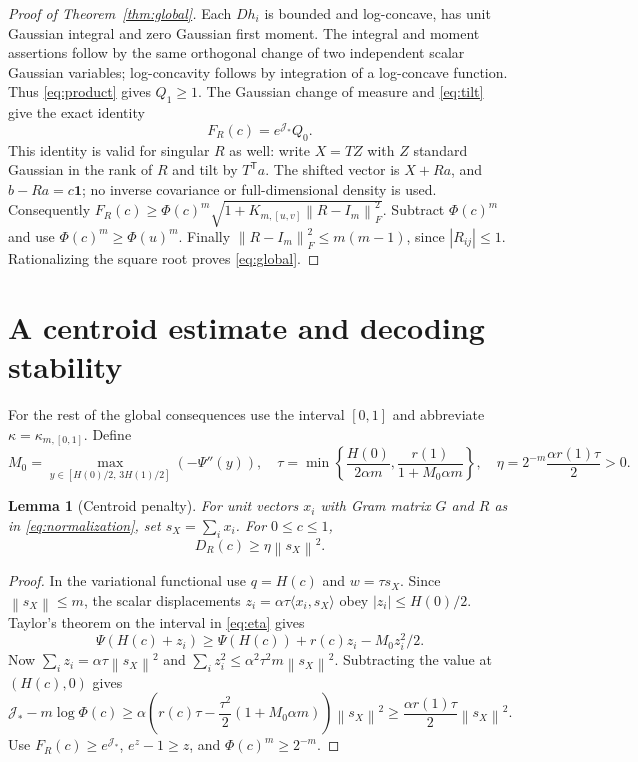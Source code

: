 \documentclass[11pt]{article}
\newtheorem{lemma}[theorem]{Lemma}
\theoremstyle{remark}\newtheorem{remark}[theorem]{Remark}
\newcommand{\one}{\mathbf 1}
\newcommand{\norm}[1]{\left\lVert#1\right\rVert}
\begin{document}
\begin{proof}[Proof of Theorem~\ref{thm:global}]
Each $Dh_i$ is bounded and log-concave, has unit Gaussian integral and zero
Gaussian first moment. The integral and moment assertions follow by the same
orthogonal change of two independent scalar Gaussian variables; log-concavity
follows by integration of a log-concave function. Thus \eqref{eq:product} gives
$Q_1\ge1$. The Gaussian change of measure and \eqref{eq:tilt} give the exact identity
\[
 F_R(c)=e^{\mathcal J_*}Q_0.
\]
This identity is valid for singular $R$ as well: write $X=TZ$ with
$Z$ standard Gaussian in the rank of $R$ and tilt by
$T^{\mathsf T}a$. The shifted vector is $X+Ra$, and $b-Ra=c\one$;
no inverse covariance or full-dimensional density is used.
Consequently $F_R(c)\ge\Phi(c)^m\sqrt{1+K_{m,[u,v]}\norm{R-I_m}_F^2}$.
Subtract $\Phi(c)^m$ and use $\Phi(c)^m\ge\Phi(u)^m$.
Finally $\norm{R-I_m}_F^2\le m(m-1)$, since $|R_{ij}|\le1$.
Rationalizing the square root proves \eqref{eq:global}.
\end{proof}

\section{A centroid estimate and decoding stability}
For the rest of the global consequences use the interval $[0,1]$ and abbreviate
$\kappa=\kappa_{m,[0,1]}$. Define
\begin{equation}\label{eq:eta}
 M_0=\max_{y\in[H(0)/2,\,3H(1)/2]}(-\Psi''(y)),\quad
 \tau=\min\left\{\frac{H(0)}{2\alpha m},
                    \frac{r(1)}{1+M_0\alpha m}\right\},\quad
 \eta=2^{-m}\frac{\alpha r(1)\tau}{2}>0.
\end{equation}

\begin{lemma}[Centroid penalty]\label{lem:centroid}
For unit vectors $x_i$ with Gram matrix $G$ and $R$ as in
\eqref{eq:normalization}, set $s_X=\sum_i x_i$. For $0\le c\le1$,
\begin{equation}\label{eq:centroid}
 D_R(c)\ge\eta\norm{s_X}^2.
\end{equation}
\end{lemma}
\begin{proof}
In the variational functional use $q=H(c)$ and $w=\tau s_X$.
Since $\norm{s_X}\le m$, the scalar displacements
$z_i=\alpha\tau\langle x_i,s_X\rangle$ obey $|z_i|\le H(0)/2$.
Taylor's theorem on the interval in \eqref{eq:eta} gives
\[
 \Psi(H(c)+z_i)\ge\Psi(H(c))+r(c)z_i-M_0z_i^2/2.
\]
Now $\sum_i z_i=\alpha\tau\norm{s_X}^2$ and
$\sum_i z_i^2\le\alpha^2\tau^2m\norm{s_X}^2$.
Subtracting the value at $(H(c),0)$ gives
\[
 \mathcal J_* -m\log\Phi(c)
 \ge\alpha\left(r(c)\tau-\frac{\tau^2}{2}(1+M_0\alpha m)\right)\norm{s_X}^2
 \ge\frac{\alpha r(1)\tau}{2}\norm{s_X}^2.
\]
Use $F_R(c)\ge e^{\mathcal J_*}$, $e^z-1\ge z$, and $\Phi(c)^m\ge2^{-m}$.
\end{proof}
\end{document}
